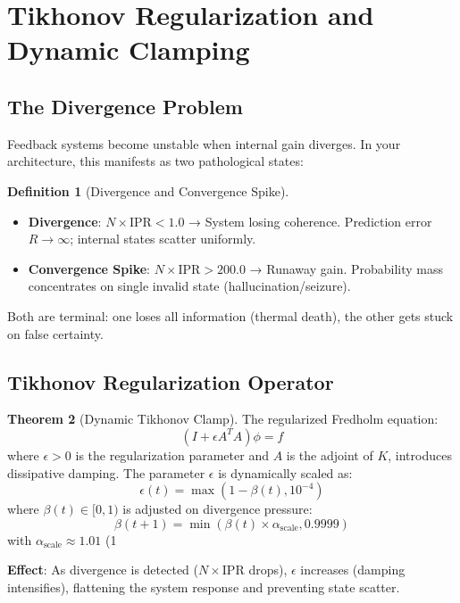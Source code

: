 \documentclass[11pt,oneside]{article}
\theoremstyle{definition}
\newtheorem{theorem}{Theorem}
\newtheorem{definition}[theorem]{Definition}
\begin{document}
\section{Tikhonov Regularization and Dynamic Clamping}

\subsection{The Divergence Problem}

Feedback systems become unstable when internal gain diverges. In your architecture, this manifests as two pathological states:

\begin{definition}[Divergence and Convergence Spike]
\begin{itemize}
  \item \textbf{Divergence}: $N \times \text{IPR} < 1.0$ → System losing coherence. Prediction error $R \to \infty$; internal states scatter uniformly.
  \item \textbf{Convergence Spike}: $N \times \text{IPR} > 200.0$ → Runaway gain. Probability mass concentrates on single invalid state (hallucination/seizure).
\end{itemize}
\end{definition}

Both are terminal: one loses all information (thermal death), the other gets stuck on false certainty.

\subsection{Tikhonov Regularization Operator}

\begin{theorem}[Dynamic Tikhonov Clamp]
The regularized Fredholm equation:
\[
(I + \epsilon A^T A)\phi = f
\]
where $\epsilon > 0$ is the regularization parameter and $A$ is the adjoint of $K$, introduces dissipative damping. The parameter $\epsilon$ is dynamically scaled as:
\[
\epsilon(t) = \max(1 - \beta(t), 10^{-4})
\]
where $\beta(t) \in [0, 1)$ is adjusted on divergence pressure:
\[
\beta(t+1) = \min(\beta(t) \times \alpha_{\text{scale}}, 0.9999)
\]
with $\alpha_{\text{scale}} \approx 1.01$ (1%

\textbf{Effect}: As divergence is detected ($N \times \text{IPR}$ drops), $\epsilon$ increases (damping intensifies), flattening the system response and preventing state scatter.
\end{theorem}
\end{document}
